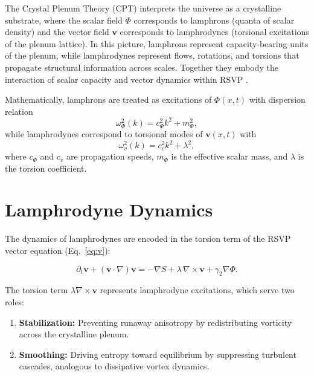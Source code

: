 \documentclass[12pt]{report}
\begin{document}
The Crystal Plenum Theory (CPT) interprets the universe as a crystalline substrate, where the scalar field $\Phi$ corresponds to lamphrons (quanta of scalar density) and the vector field $\mathbf{v}$ corresponds to lamphrodynes (torsional excitations of the plenum lattice).  
In this picture, lamphrons represent capacity-bearing units of the plenum, while lamphrodynes represent flows, rotations, and torsions that propagate structural information across scales. Together they embody the interaction of scalar capacity and vector dynamics within RSVP \citep{Flyxion2025}.

Mathematically, lamphrons are treated as excitations of $\Phi(x,t)$ with dispersion relation
\begin{equation}
\omega_\Phi^2(k) = c_\Phi^2 k^2 + m_\Phi^2,
\end{equation}
while lamphrodynes correspond to torsional modes of $\mathbf{v}(x,t)$ with
\begin{equation}
\omega_v^2(k) = c_v^2 k^2 + \lambda^2,
\end{equation}
where $c_\Phi$ and $c_v$ are propagation speeds, $m_\Phi$ is the effective scalar mass, and $\lambda$ is the torsion coefficient.

\section{Lamphrodyne Dynamics}

The dynamics of lamphrodynes are encoded in the torsion term of the RSVP vector equation (Eq.~\eqref{eq:v}):

\begin{equation}
\partial_t \mathbf{v} + (\mathbf{v}\cdot\nabla)\mathbf{v} = -\nabla S + \lambda \, \nabla \times \mathbf{v} + \gamma_2 \nabla \Phi.
\label{eq:lamphrodyne}
\end{equation}

The torsion term $\lambda \nabla \times \mathbf{v}$ represents lamphrodyne excitations, which serve two roles:

\begin{enumerate}
    \item \textbf{Stabilization:} Preventing runaway anisotropy by redistributing vorticity across the crystalline plenum.  
    \item \textbf{Smoothing:} Driving entropy toward equilibrium by suppressing turbulent cascades, analogous to dissipative vortex dynamics.  
\end{enumerate}
\end{document}
